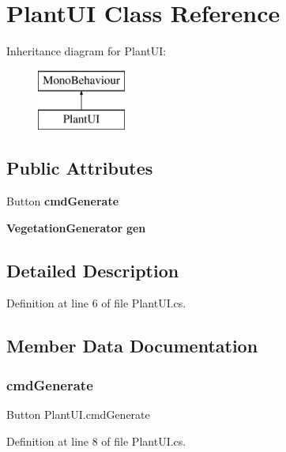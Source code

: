 \section{Plant\+UI Class Reference}
\label{class_plant_u_i}
Inheritance diagram for Plant\+UI\+:\begin{figure}[H]
\begin{center}
\leavevmode
\includegraphics[height=2.000000cm]{class_plant_u_i}
\end{center}
\end{figure}
\subsection*{Public Attributes}
\begin{DoxyCompactItemize}
\item 
Button \textbf{ cmd\+Generate}
\item 
\textbf{ Vegetation\+Generator} \textbf{ gen}
\end{DoxyCompactItemize}


\subsection{Detailed Description}


Definition at line 6 of file Plant\+U\+I.\+cs.



\subsection{Member Data Documentation}
\mbox{\label{class_plant_u_i_a2215f693708da4410fee3b8ee896cf79}} 
\subsubsection{cmd\+Generate}
{\footnotesize\ttfamily Button Plant\+U\+I.\+cmd\+Generate}



Definition at line 8 of file Plant\+U\+I.\+cs.

\mbox{\label{class_plant_u_i_a2fd7861da5a0d27ef829d70d68f22cdc}} 
